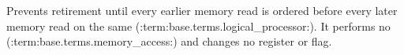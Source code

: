 Prevents retirement until every earlier memory read is ordered before every later memory read on the same (:term:base.terms.logical_processor:). It performs no (:term:base.terms.memory_access:) and changes no register or flag.
